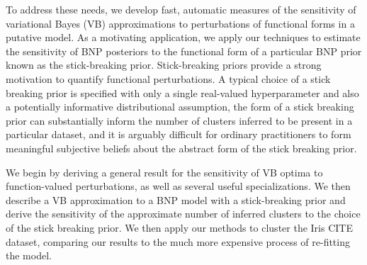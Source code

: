 \documentclass[a4paper]{article}
\begin{document}
To address these needs, we develop fast, automatic measures of the sensitivity of
variational Bayes (VB) approximations to perturbations of functional forms in a putative model.
As a motivating application, we apply our techniques to estimate the sensitivity of BNP posteriors
to the functional form of a particular BNP prior known as the stick-breaking prior.
Stick-breaking priors provide a strong motivation to
quantify functional perturbations. A typical choice of a stick breaking prior is
specified with only a single real-valued hyperparameter and also a potentially
informative distributional assumption, the form of a stick breaking prior can
substantially inform the number of clusters inferred to be present in a particular
dataset, and it is arguably difficult for ordinary practitioners to form meaningful
subjective beliefs about the abstract form of the stick breaking prior.

We begin by deriving a general result for the sensitivity of VB optima to
function-valued perturbations, as well as several useful specializations.
We then describe a VB approximation to a BNP model with a stick-breaking prior and
derive the sensitivity of the approximate number of inferred clusters to the choice of the stick breaking prior.
We then apply our methods to cluster the Iris CITE dataset,
comparing our results to the much more expensive process of re-fitting the model.
\end{document}
